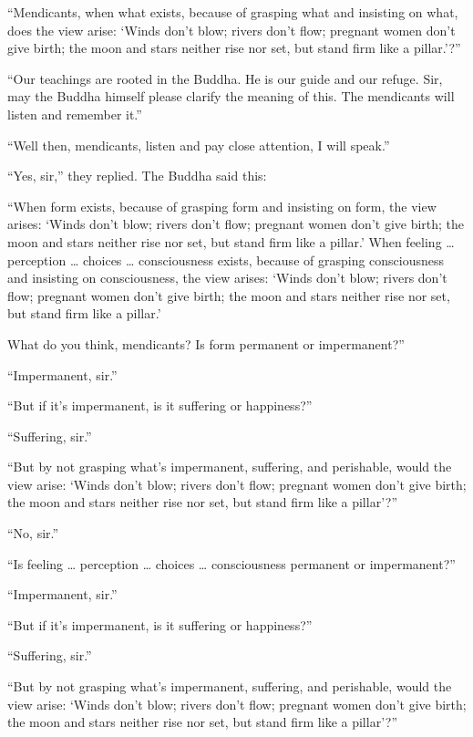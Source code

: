 \documentclass[12pt,openany]{book}%
\begin{document}
“Mendicants, when what exists, because of grasping what and insisting on what, does the view arise: ‘Winds don’t blow; rivers don’t flow; pregnant women don’t give birth; the moon and stars neither rise nor set, but stand firm like a pillar.’?” 

“Our teachings are rooted in the Buddha. He is our guide and our refuge. Sir, may the Buddha himself please clarify the meaning of this. The mendicants will listen and remember it.” 

“Well then, mendicants, listen and pay close attention, I will speak.” 

“Yes, sir,” they replied. The Buddha said this: 

“When form exists, because of grasping form and insisting on form, the view arises: ‘Winds don’t blow; rivers don’t flow; pregnant women don’t give birth; the moon and stars neither rise nor set, but stand firm like a pillar.’ When feeling … perception … choices … consciousness exists, because of grasping consciousness and insisting on consciousness, the view arises: ‘Winds don’t blow; rivers don’t flow; pregnant women don’t give birth; the moon and stars neither rise nor set, but stand firm like a pillar.’ 

What do you think, mendicants? Is form permanent or impermanent?” 

“Impermanent, sir.” 

“But if it’s impermanent, is it suffering or happiness?” 

“Suffering, sir.” 

“But by not grasping what’s impermanent, suffering, and perishable, would the view arise: ‘Winds don’t blow; rivers don’t flow; pregnant women don’t give birth; the moon and stars neither rise nor set, but stand firm like a pillar’?” 

“No, sir.” 

“Is feeling … perception … choices … consciousness permanent or impermanent?” 

“Impermanent, sir.” 

“But if it’s impermanent, is it suffering or happiness?” 

“Suffering, sir.” 

“But by not grasping what’s impermanent, suffering, and perishable, would the view arise: ‘Winds don’t blow; rivers don’t flow; pregnant women don’t give birth; the moon and stars neither rise nor set, but stand firm like a pillar’?” 
\end{document}
